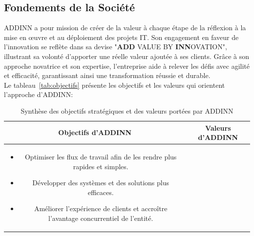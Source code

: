\subsection{Fondements de la Société\cite{apropos}}
    \acs{ADDINN} a pour mission de créer de la valeur à chaque étape de la réflexion à la mise en œuvre et au déploiement des projets \acs{IT}. Son engagement en faveur de l’innovation se reflète dans sa devise "\textbf{ADD} VALUE BY \textbf{INN}OVATION", illustrant sa volonté d’apporter une réelle valeur ajoutée à ses clients. Grâce à son approche novatrice et son expertise, l'entreprise aide à relever les défis avec agilité et efficacité, garantissant ainsi une transformation réussie et durable.\\
    Le tableau~\ref{tab:objectifs} présente les objectifs et les valeurs qui orientent l’approche d’ADDINN:
    \begin{table}[H]
        \centering
        \caption{Synthèse des objectifs stratégiques et des valeurs portées par ADDINN}
        \renewcommand{\arraystretch}{1.5}
        \begin{tabular}{|c|c|}
            \hline
          \textbf{ Objectifs d’ADDINN }  & \textbf{Valeurs d’ADDINN}\\ \hline
            \begin{minipage}{.48\textwidth}
                \vspace{0.15cm}
                 \begin{justify}
                    \begin{itemize}[label=$\bullet$,left=-0.1cm]
                        \item Optimiser les flux de travail afin de les rendre plus rapides et simples.
                        \item Développer des systèmes et des solutions plus efficaces.
                        \item Améliorer l'expérience de clients et accroître l'avantage concurrentiel de l'entité.
                    \end{itemize}
                \end{justify}
                \vspace{0.15cm}
            \end{minipage}
              & 
            \begin{minipage}{.48\textwidth}
                \vspace{0.15cm}
                 \begin{justify}
                    \begin{itemize}[label=$\bullet$,left=-0.1cm]

\end{itemize}
\end{justify}
\end{minipage}
\end{tabular}
\end{table}
